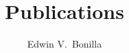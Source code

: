 \documentclass[11pt]{article}
\author{Edwin V.~Bonilla}
\title{Publications}
\begin{document}
  \maketitle
  \nocite{*}
   
  
\end{document}
